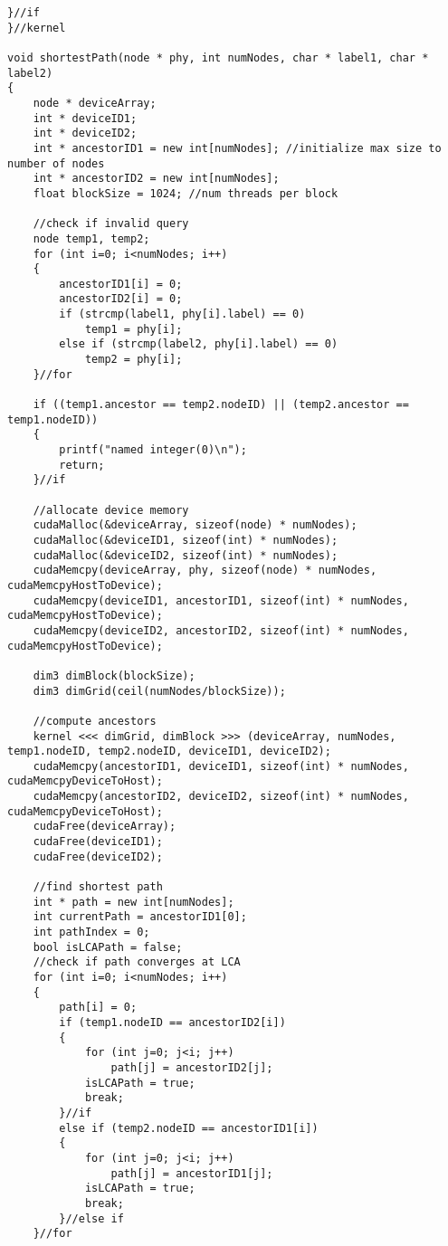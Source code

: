 \documentclass[11pt,letterpaper]{article}
\begin{document}
\begin{lstlisting}[style=MyC++Style]
    }//if
}//kernel

void shortestPath(node * phy, int numNodes, char * label1, char * label2)
{
    node * deviceArray;
    int * deviceID1;
    int * deviceID2;
    int * ancestorID1 = new int[numNodes]; //initialize max size to number of nodes
    int * ancestorID2 = new int[numNodes];
    float blockSize = 1024; //num threads per block

    //check if invalid query
    node temp1, temp2;
    for (int i=0; i<numNodes; i++)
    {
        ancestorID1[i] = 0;
        ancestorID2[i] = 0;
        if (strcmp(label1, phy[i].label) == 0)
            temp1 = phy[i];
        else if (strcmp(label2, phy[i].label) == 0)
            temp2 = phy[i];
    }//for

    if ((temp1.ancestor == temp2.nodeID) || (temp2.ancestor == temp1.nodeID))
    {
        printf("named integer(0)\n");
        return;
    }//if

    //allocate device memory
    cudaMalloc(&deviceArray, sizeof(node) * numNodes);
    cudaMalloc(&deviceID1, sizeof(int) * numNodes);
    cudaMalloc(&deviceID2, sizeof(int) * numNodes);
    cudaMemcpy(deviceArray, phy, sizeof(node) * numNodes, cudaMemcpyHostToDevice);
    cudaMemcpy(deviceID1, ancestorID1, sizeof(int) * numNodes, cudaMemcpyHostToDevice);
    cudaMemcpy(deviceID2, ancestorID2, sizeof(int) * numNodes, cudaMemcpyHostToDevice);

    dim3 dimBlock(blockSize);
    dim3 dimGrid(ceil(numNodes/blockSize));
    
	//compute ancestors
    kernel <<< dimGrid, dimBlock >>> (deviceArray, numNodes, temp1.nodeID, temp2.nodeID, deviceID1, deviceID2);
    cudaMemcpy(ancestorID1, deviceID1, sizeof(int) * numNodes, cudaMemcpyDeviceToHost);
    cudaMemcpy(ancestorID2, deviceID2, sizeof(int) * numNodes, cudaMemcpyDeviceToHost);
    cudaFree(deviceArray);
    cudaFree(deviceID1);
    cudaFree(deviceID2);

    //find shortest path
    int * path = new int[numNodes];
    int currentPath = ancestorID1[0];
    int pathIndex = 0;
    bool isLCAPath = false;
    //check if path converges at LCA
    for (int i=0; i<numNodes; i++)
    {
        path[i] = 0;
        if (temp1.nodeID == ancestorID2[i])
        {
            for (int j=0; j<i; j++)
                path[j] = ancestorID2[j];
            isLCAPath = true;
            break;
        }//if   
        else if (temp2.nodeID == ancestorID1[i])
        {
            for (int j=0; j<i; j++)
                path[j] = ancestorID1[j];
            isLCAPath = true;
            break;
        }//else if
    }//for
    

\end{lstlisting}
\end{document}
